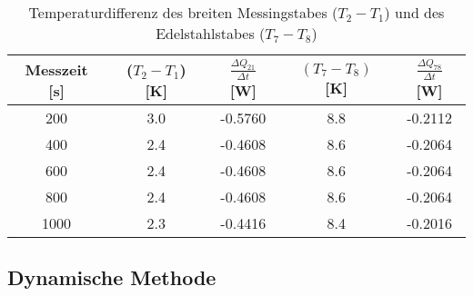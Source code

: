 \begin{table}
	\centering
	\caption{Temperaturdifferenz des breiten Messingstabes ($T_2 - T_1$) und des Edelstahlstabes ($T_7 - T_8$)}
	\label{tab:wärmestrom}
	\begin{tabular}{c c c c c}
		\toprule
		Messzeit [s] & ($T_2 - T_1$) [K] & $ \frac{\Delta Q_{21}}{\Delta t}$ [W] & $(T_7 - T_8)$ [K] & $ \frac{\Delta Q_{78}}{\Delta t}$ [W] \\
		\midrule
		200  & 3.0	& -0.5760 & 8.8	&-0.2112	\\
		400  & 2.4	& -0.4608 & 8.6	&-0.2064	\\
		600  & 2.4	& -0.4608 & 8.6	&-0.2064	\\
		800  & 2.4	& -0.4608 & 8.6	&-0.2064	\\
		1000 & 2.3	& -0.4416 & 8.4	&-0.2016	\\
		\bottomrule
	\end{tabular}
\end{table}

\subsection{Dynamische Methode}
